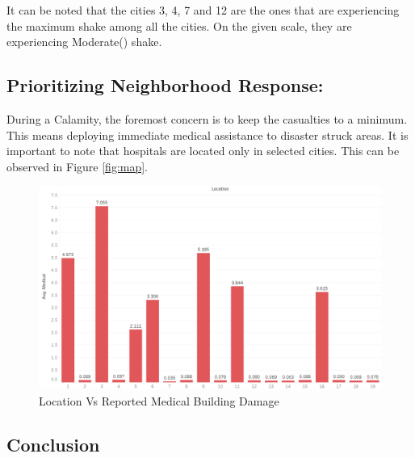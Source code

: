 \documentclass[12pt]{extarticle}
\begin{document}
It can be noted that the cities 3, 4, 7 and 12 are the ones that are experiencing the maximum shake among all the cities. On the given scale, they are experiencing Moderate() shake. 
	
\subsection{Prioritizing Neighborhood Response:}
During a Calamity, the foremost concern is to keep the casualties to a minimum. This means deploying immediate medical assistance to disaster struck areas. It is important to note that hospitals are located only in selected cities. This can be observed in Figure \ref{fig:map}.    


\begin{figure}[H]
\centering
	\includegraphics[width =\linewidth]{Images/medical.png}
	\caption{Location Vs Reported Medical Building Damage }
	\label{fig:medical}
\end{figure}
 
 \newpage
\begin{centering}
	\section{Conclusion}
\end{centering}
\end{document}

